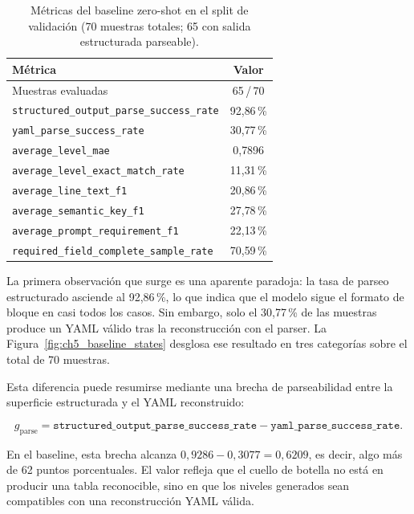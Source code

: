 \begin{table}[htbp]
\centering
\caption{Métricas del baseline zero-shot en el split de validación
         (70 muestras totales; 65 con salida estructurada parseable).}
\label{tab:ch5_baseline_metrics}
\begin{tabular}{lc}
\toprule
\textbf{Métrica} & \textbf{Valor} \\
\midrule
Muestras evaluadas             & 65\,/\,70 \\
\texttt{structured\_output\_parse\_success\_rate} & 92{,}86\,\% \\
\texttt{yaml\_parse\_success\_rate}               & 30{,}77\,\% \\
\texttt{average\_level\_mae}                      & 0{,}7896 \\
\texttt{average\_level\_exact\_match\_rate}       & 11{,}31\,\% \\
\texttt{average\_line\_text\_f1}                  & 20{,}86\,\% \\
\texttt{average\_semantic\_key\_f1}               & 27{,}78\,\% \\
\texttt{average\_prompt\_requirement\_f1}         & 22{,}13\,\% \\
\texttt{required\_field\_complete\_sample\_rate}  & 70{,}59\,\% \\
\bottomrule
\end{tabular}
\end{table}

La primera observación que surge es una aparente paradoja: la tasa de parseo estructurado
asciende al 92{,}86\,\%, lo que indica que el modelo sigue el formato de bloque en casi todos
los casos. Sin embargo, solo el 30{,}77\,\% de las muestras produce un YAML válido tras la
reconstrucción con el parser. La Figura~\ref{fig:ch5_baseline_states} desglosa ese resultado
en tres categorías sobre el total de 70 muestras.

Esta diferencia puede resumirse mediante una brecha de parseabilidad entre la superficie estructurada y el YAML reconstruido:

\[
g_{\mathrm{parse}} =
\texttt{structured\_output\_parse\_success\_rate}
-
\texttt{yaml\_parse\_success\_rate}.
\]

En el baseline, esta brecha alcanza \(0{,}9286 - 0{,}3077 = 0{,}6209\), es decir, algo más de 62 puntos porcentuales. El valor refleja que el cuello de botella no está en producir una tabla reconocible, sino en que los niveles generados sean compatibles con una reconstrucción YAML válida.

